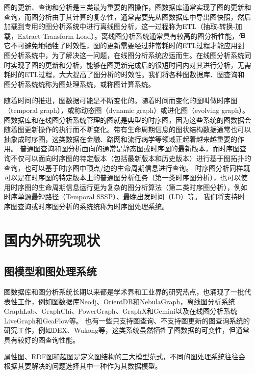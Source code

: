 图的更新、查询和分析是三类最为重要的图操作，图数据库通常实现了图的更新和查询，而图分析由于其计算的复杂性，通常需要先从图数据库中导出图快照，然后加载到专用的图分析系统中进行离线图分析，这一过程称为ETL（抽取-转换-加载，Extract-Transform-Load）。离线图分析系统通常具有较高的图分析性能，但它不可避免地牺牲了时效性，图的更新需要经过非常耗时的ETL过程才能应用到图分析系统中，为了解决这一问题，在线图分析系统应运而生。在线图分析系统同时实现了图的更新和分析，能够在图更新完成后的很短时间内对其进行分析，无需耗时的ETL过程，大大提高了图分析的时效性。我们将各种图数据库、图查询和图分析系统统称为图处理系统，或称图计算系统。

随着时间的推进，图数据可能是不断变化的。随着时间而变化的图叫做时序图（temporal graph），或称动态图（dynamic graph）或进化图（evolving graph）。
图数据库和在线图分析系统管理的图就是典型的时序图，因为这些系统的图数据会随着图更新操作的执行而不断变化。带有生命周期信息的图状结构数据通常也可以抽象成时序图，这类数据在金融\cite{Haslhofer2016OBW}、路网\cite{COOKE1966493}和流行病学等领域正起着越来越重要的作用。
普通图查询和图分析面向的通常是静态图或时序图的最新版本，而时序图查询不仅可以面向时序图的特定版本（包括最新版本和历史版本）进行基于图拓扑的查询，也可以基于时序图中顶点/边的生命周期信息进行查询。
时序图分析同样既可以是在时序图的特定版本上的普通图分析任务（第一类时序图分析），也可以使用时序图的生命周期信息运行更为复杂的图分析算法（第二类时序图分析），例如时序单源最短路径（Temporal SSSP）、最晚出发时间（LD）\cite{type2tgp}等。
我们将支持时序图查询或时序图分析的系统统称为时序图处理系统。

\section{国内外研究现状}
\subsection{图模型和图处理系统}
图数据库和图分析系统长期以来都是学术界和工业界的研究热点，也涌现了一批代表性工作，例如图数据库Neo4j\cite{neo4j}、OrientDB\cite{OrientDB}和NebulaGraph\cite{nebula}，离线图分析系统GraphLab\cite{graphlab}、GraphChi\cite{GraphChi}、PowerGraph\cite{PowerGraph}、GraphX\cite{GraphX}和Gemini\cite{Gemini}以及在线图分析系统LiveGraph\cite{LiveGraph}和GeaFlow\cite{GeaFlow}等。
也有一些只支持图查询、不支持图更新的图查询系统的研究工作，例如DEX\cite{dex}、Wukong\cite{wukong}等，这类系统虽然牺牲了图数据的可变性，但通常具有较好的图查询性能。

属性图\cite{Angles2018ThePG}、RDF\cite{rdf}图和超图是定义图结构的三大模型范式，不同的图处理系统往往会根据其要解决的问题选择其中一种作为其数据模型。

